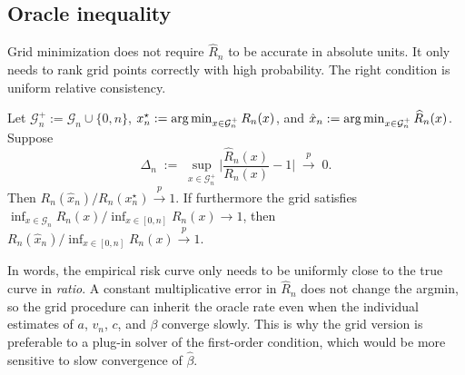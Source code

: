 \subsection{Oracle inequality}\label{ssec:adaptive-oracle}

Grid minimization does not require $\widehat R_n$ to be accurate in absolute units. It only needs to rank grid points correctly with high probability. The right condition is uniform relative consistency.

\begin{theorem}\label{thm:adaptive}
Let $\mathcal{G}_n^+:=\mathcal{G}_n\cup\{0,n\}$, $x_n^\star:=\operatorname*{arg\,min}_{x\in\mathcal{G}_n^+}R_n(x)$, and $\hat x_n:=\operatorname*{arg\,min}_{x\in\mathcal{G}_n^+}\widehat R_n(x)$. Suppose
\begin{equation}\label{eq:Delta-n}
  \Delta_n\;:=\;\sup_{x\in\mathcal{G}_n^+}\biggl|\frac{\widehat R_n(x)}{R_n(x)}-1\biggr|\;\stackrel{p}{\to}\;0.
\end{equation}
Then $R_n(\hat x_n)/R_n(x_n^\star)\stackrel{p}{\to}1$. If furthermore the grid satisfies $\inf_{x\in\mathcal{G}_n}R_n(x)/\inf_{x\in[0,n]}R_n(x)\to 1$, then $R_n(\hat x_n)/\inf_{x\in[0,n]}R_n(x)\stackrel{p}{\to}1$.
\end{theorem}

In words, the empirical risk curve only needs to be uniformly close to the true curve in \emph{ratio}. A constant multiplicative error in $\widehat R_n$ does not change the argmin, so the grid procedure can inherit the oracle rate even when the individual estimates of $a$, $v_n$, $c$, and $\beta$ converge slowly. This is why the grid version is preferable to a plug-in solver of the first-order condition, which would be more sensitive to slow convergence of $\hat\beta$.



